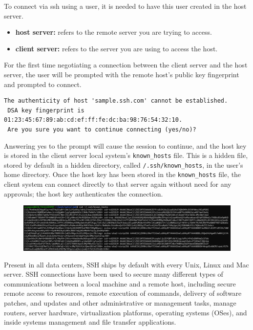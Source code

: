 \documentclass{article}
\newenvironment{blocktemplate}[1]{%
    \tcolorbox[beamer,%
    noparskip,breakable,
    colframe=Blue,%
    colbacklower=LimeGreen!75!LightGreen,%
    title=#1]}%
    {\endtcolorbox}
\newenvironment{codetemplate}[1][]{%
  \mybasecolorbox[#1]
  \itshape
}{%
  \endmybasecolorbox
}
\begin{document}
\begin{blocktemplate}{NOTE}
To connect via ssh using a user, it is needed to have this user created in the host server.

\begin{itemize}
    \item \textbf{host server:} refers to the remote server you are trying to access.
    \item \textbf{client server:} refers to the server you are using to access the host.
\end{itemize}
\end{blocktemplate}

For the first time negotiating a connection between the client server and the host server, the user will be prompted with the remote host's public key fingerprint and prompted to connect.

\begin{codetemplate}{}
\begin{verbatim}
The authenticity of host 'sample.ssh.com' cannot be established.
 DSA key fingerprint is 01:23:45:67:89:ab:cd:ef:ff:fe:dc:ba:98:76:54:32:10.
 Are you sure you want to continue connecting (yes/no)?
\end{verbatim}
\end{codetemplate}

Answering yes to the prompt will cause the session to continue, and the host key is stored in the client server local system's \verb|known_hosts| file. This is a hidden file, stored by default in a hidden directory, called \verb|/.ssh/known_hosts|, in the user's home directory. Once the host key has been stored in the \verb|known_hosts| file, the client system can connect directly to that server again without need for any approvals; the host key authenticates the connection.

\begin{figure}[H]
    \includegraphics[width=\textwidth]{pictures/ssh1.png}
    \centering
\end{figure}

Present in all data centers, SSH ships by default with every Unix, Linux and Mac server. SSH connections have been used to secure many different types of communications between a local machine and a remote host, including secure remote access to resources, remote execution of commands, delivery of software patches, and updates and other administrative or management tasks, manage routers, server hardware, virtualization platforms, operating systems (OSes), and inside systems management and file transfer applications.
\end{document}
